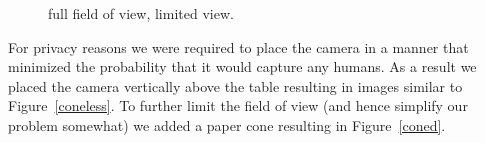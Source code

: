 \begin{figure}[!h]
\begin{center}
\hfill
{}
\caption[Input images]{ full field of view,  limited view.}
\label{fig:input}
\end{center}
\end{figure}
For privacy reasons we were required to place the camera in a manner that minimized the probability that it would
capture any humans. As a result we placed the camera vertically above the table resulting in images similar to
Figure~\ref{coneless}. To further limit the field of view (and hence simplify our problem somewhat) we added a paper
cone resulting in Figure~\ref{coned}. 

